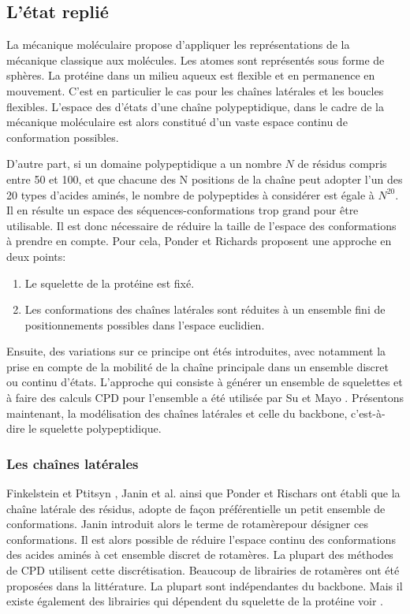 \subsection{L'état replié }
La mécanique moléculaire propose d'appliquer les représentations de la mécanique classique aux molécules. Les atomes sont représentés sous forme de sphères. La protéine dans un milieu aqueux est flexible et en permanence en mouvement. C'est en particulier le cas pour les chaînes latérales et les boucles flexibles. L'espace des d'états d'une chaîne polypeptidique, dans le cadre de la mécanique moléculaire est alors constitué d'un vaste espace continu de conformation possibles.

D'autre part, si un domaine polypeptidique a un nombre $N$ de résidus compris entre 50 et 100, et que chacune des N positions de la chaîne peut adopter l'un des 20 types d'acides aminés, le nombre de polypeptides à considérer est égale à  $N^{20}$. Il en résulte un espace des séquences-conformations trop grand pour être utilisable. Il est donc nécessaire de réduire la taille de l'espace des conformations à prendre en compte. Pour cela, Ponder et Richards \cite{Ponder87} proposent une approche en deux points:
\begin{enumerate}[leftmargin=*]
\item Le squelette de la protéine est fixé.
\item Les conformations des chaînes latérales sont réduites à un ensemble fini de positionnements possibles dans l'espace euclidien.
\end{enumerate}  
Ensuite, des variations sur ce principe ont étés introduites, avec notamment la prise en compte de la mobilité de la chaîne principale dans un ensemble discret ou continu d'états. L'approche qui consiste à générer un ensemble de squelettes et à faire des calculs CPD pour l'ensemble a été utilisée par Su et Mayo \cite{Su97}. 
Présentons maintenant, la modélisation des chaînes latérales et celle du backbone, c'est-à-dire le squelette polypeptidique.

\subsubsection{Les chaînes latérales}

Finkelstein et Ptitsyn \cite{Finkelstein77}, Janin et al. \cite{Janin78} ainsi que Ponder et Rischars \cite{Ponder87} ont établi que la chaîne latérale des résidus, adopte de façon préférentielle un petit ensemble de conformations. Janin introduit alors le terme de \og rotamère\fg pour désigner ces conformations. Il est alors possible de réduire l'espace continu des conformations des acides aminés à cet ensemble discret de rotamères. La plupart des méthodes de CPD utilisent cette discrétisation. Beaucoup de librairies de rotamères ont été proposées dans la littérature. La plupart sont indépendantes du backbone. Mais il existe également des librairies qui dépendent du squelette de la protéine voir \cite{McGregor87,Dunbrack93}. 

